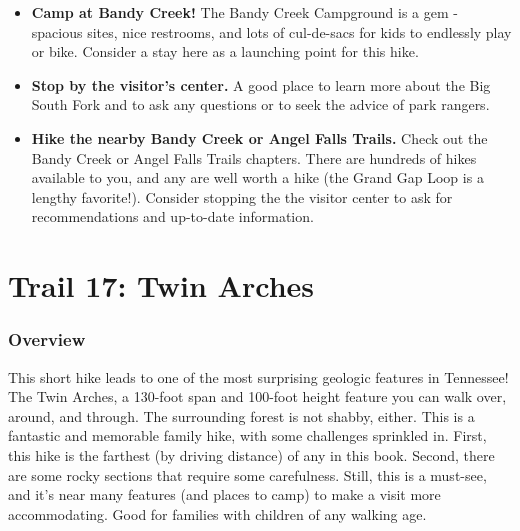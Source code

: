 \documentclass[
  letterpaper,
  DIV=11,
  numbers=noendperiod]{scrreprt}
\providecommand{\tightlist}{%
  \setlength{\itemsep}{0pt}\setlength{\parskip}{0pt}}\usepackage{longtable,booktabs,array}
\begin{document}
\begin{itemize}
\tightlist
\item
  \textbf{Camp at Bandy Creek!} The Bandy Creek Campground is a gem -
  spacious sites, nice restrooms, and lots of cul-de-sacs for kids to
  endlessly play or bike. Consider a stay here as a launching point for
  this hike.
\item
  \textbf{Stop by the visitor's center.} A good place to learn more
  about the Big South Fork and to ask any questions or to seek the
  advice of park rangers.
\item
  \textbf{Hike the nearby Bandy Creek or Angel Falls Trails.} Check out
  the Bandy Creek or Angel Falls Trails chapters. There are hundreds of
  hikes available to you, and any are well worth a hike (the Grand Gap
  Loop is a lengthy favorite!). Consider stopping the the visitor center
  to ask for recommendations and up-to-date information.
\end{itemize}

\chapter{Trail 17: Twin Arches}\label{trail-17-twin-arches}

\subsection{Overview}\label{overview-17}

This short hike leads to one of the most surprising geologic features in
Tennessee! The Twin Arches, a 130-foot span and 100-foot height feature
you can walk over, around, and through. The surrounding forest is not
shabby, either. This is a fantastic and memorable family hike, with some
challenges sprinkled in. First, this hike is the farthest (by driving
distance) of any in this book. Second, there are some rocky sections
that require some carefulness. Still, this is a must-see, and it's near
many features (and places to camp) to make a visit more accommodating.
Good for families with children of any walking age.
\end{document}
